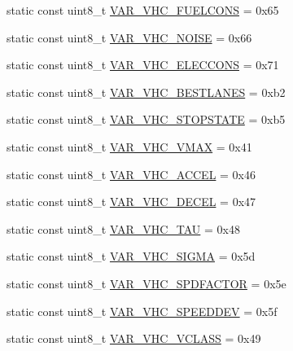 \begin{DoxyCompactItemize}
\item 
static const uint8\+\_\+t \hyperlink{classtraci__api_1_1_vehicle_manager_a2feb4c2aeaf374f8c1fbe85a6454ebb4}{V\+A\+R\+\_\+\+V\+H\+C\+\_\+\+F\+U\+E\+L\+C\+O\+NS} = 0x65
\item 
static const uint8\+\_\+t \hyperlink{classtraci__api_1_1_vehicle_manager_a8a0d3fdb9304ddf489d123d7ca8f22ea}{V\+A\+R\+\_\+\+V\+H\+C\+\_\+\+N\+O\+I\+SE} = 0x66
\item 
static const uint8\+\_\+t \hyperlink{classtraci__api_1_1_vehicle_manager_ad024b88f1fc94552b00883340f376440}{V\+A\+R\+\_\+\+V\+H\+C\+\_\+\+E\+L\+E\+C\+C\+O\+NS} = 0x71
\item 
static const uint8\+\_\+t \hyperlink{classtraci__api_1_1_vehicle_manager_a4318c2219a5f58300d7b263c50ec38b5}{V\+A\+R\+\_\+\+V\+H\+C\+\_\+\+B\+E\+S\+T\+L\+A\+N\+ES} = 0xb2
\item 
static const uint8\+\_\+t \hyperlink{classtraci__api_1_1_vehicle_manager_aeb39f34fdafd857f65b4837489b78d2c}{V\+A\+R\+\_\+\+V\+H\+C\+\_\+\+S\+T\+O\+P\+S\+T\+A\+TE} = 0xb5
\item 
static const uint8\+\_\+t \hyperlink{classtraci__api_1_1_vehicle_manager_a89242125de907c71bf7b357a7f63acdd}{V\+A\+R\+\_\+\+V\+H\+C\+\_\+\+V\+M\+AX} = 0x41
\item 
static const uint8\+\_\+t \hyperlink{classtraci__api_1_1_vehicle_manager_ac9d949b248fbdb168796e0213357e003}{V\+A\+R\+\_\+\+V\+H\+C\+\_\+\+A\+C\+C\+EL} = 0x46
\item 
static const uint8\+\_\+t \hyperlink{classtraci__api_1_1_vehicle_manager_a4c88c070e03fd1b4bbc7684935d5d36d}{V\+A\+R\+\_\+\+V\+H\+C\+\_\+\+D\+E\+C\+EL} = 0x47
\item 
static const uint8\+\_\+t \hyperlink{classtraci__api_1_1_vehicle_manager_ae44405763fa9729d5f6b93fb54e1c75a}{V\+A\+R\+\_\+\+V\+H\+C\+\_\+\+T\+AU} = 0x48
\item 
static const uint8\+\_\+t \hyperlink{classtraci__api_1_1_vehicle_manager_a11f1a4ab7243f294be9ce37c889bf018}{V\+A\+R\+\_\+\+V\+H\+C\+\_\+\+S\+I\+G\+MA} = 0x5d
\item 
static const uint8\+\_\+t \hyperlink{classtraci__api_1_1_vehicle_manager_a5645ab4fd7d6938f57beda01a79f5b86}{V\+A\+R\+\_\+\+V\+H\+C\+\_\+\+S\+P\+D\+F\+A\+C\+T\+OR} = 0x5e
\item 
static const uint8\+\_\+t \hyperlink{classtraci__api_1_1_vehicle_manager_a536289815e37b9023217ade7d1cd9e84}{V\+A\+R\+\_\+\+V\+H\+C\+\_\+\+S\+P\+E\+E\+D\+D\+EV} = 0x5f
\item 
static const uint8\+\_\+t \hyperlink{classtraci__api_1_1_vehicle_manager_ac2ce3790565e9dcaf60c2f10727e6fb5}{V\+A\+R\+\_\+\+V\+H\+C\+\_\+\+V\+C\+L\+A\+SS} = 0x49

\end{DoxyCompactItemize}
